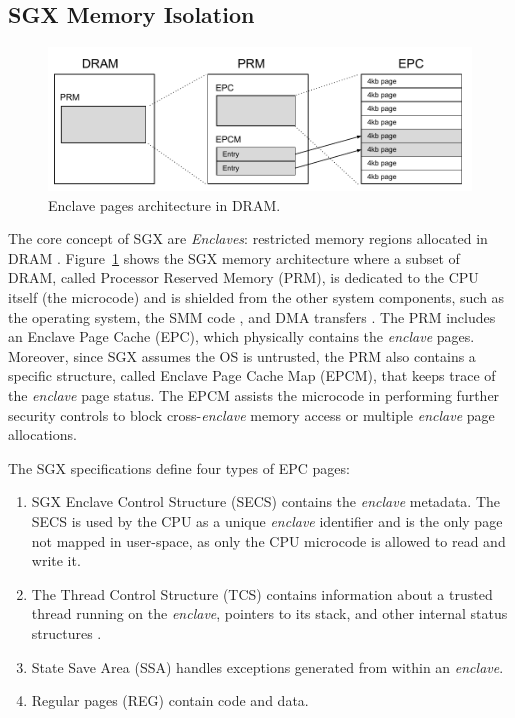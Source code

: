 \subsection{SGX Memory Isolation}
\label{ssec:sgx-core-design}

\begin{figure}[t]
	\centering
	\includegraphics[width=0.8\linewidth]{fig_c7/sgxbackground}
	\caption{Enclave pages architecture in DRAM.}
	\label{fig:sgxbackground}
\end{figure}

The core concept of SGX are \emph{Enclaves}: restricted memory regions 
allocated in DRAM \citep{costan2016intel}.
Figure~\ref{fig:sgxbackground} shows the SGX memory architecture where a subset 
of DRAM, called Processor Reserved Memory
(PRM), is dedicated to the CPU itself (\ie the microcode) and is shielded from
the other system components, such as the operating system, the SMM
code \citep{yao2009system}, and DMA transfers \citep{coke1998implementing}.
The PRM includes an Enclave Page Cache (EPC), which physically contains
the \emph{enclave} pages.
Moreover, since SGX assumes the OS is untrusted, the PRM also contains a 
specific structure, called Enclave Page Cache Map (EPCM), that keeps trace of 
the \emph{enclave} page status.
The EPCM assists the microcode in performing further security controls to block
cross-\emph{enclave} memory access or multiple \emph{enclave} page allocations.

The SGX specifications define four types of EPC pages:
\begin{enumerate}
	\item SGX Enclave Control Structure (SECS) contains the \emph{enclave} 
	metadata.
	The SECS is used by the CPU as a unique \emph{enclave} identifier and is 
	the only page not mapped in user-space, as only the CPU microcode is 
	allowed to read and write it.
	\item The Thread Control Structure (TCS) contains information about a 
	trusted thread running on the \emph{enclave}, pointers to its stack, and 
	other internal status structures \citep{intel-developer-guide}.
	\item State Save Area (SSA) handles exceptions generated from within an 
	\emph{enclave}.
	\item Regular pages (REG) contain code and data.
\end{enumerate}

